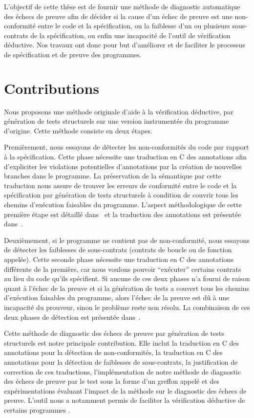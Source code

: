 L'objectif de cette thèse est de fournir une méthode de diagnostic automatique
des échecs de preuve afin de décider si la cause d'un échec de preuve est une
non-conformité entre le code et la spécification, ou la faiblesse d'un ou
plusieurs sous-contrats de la spécification, ou enfin une incapacité de l'outil
de vérification déductive.
Nos travaux ont donc pour but d'améliorer et de faciliter le processus de
spécification et de preuve des programmes.


\section{Contributions}
\label{sec:contrib}


Nous proposons une méthode originale d'aide à la vérification déductive, par
génération de tests structurels sur une version instrumentée du programme
d'origine.
Cette méthode consiste en deux étapes.

Premièrement, nous essayons de détecter les non-conformités du code par
rapport à la spécification.
Cette phase nécessite une traduction en C des annotations \acsl afin
d'expliciter les violations potentielles d'annotations par la création de
nouvelles branches dans le programme.
La préservation de la sémantique par cette traduction nous assure de trouver
les erreurs de conformité entre le code et la spécification par génération de
tests structurels à condition de couvrir tous les chemins d'exécution faisables
du programme.
L'aspect méthodologique de cette première étape est détaillé
dans~\cite{Petiot/TAP14} et la traduction des annotations est présentée
dans~\cite{Petiot/SCAM14}.

Deuxièmement, si le programme ne contient pas de non-conformité, nous essayons
de détecter les faiblesses de sous-contrats (contrats de boucle ou de fonction
appelée).
Cette seconde phase nécessite une traduction en C des annotations \acsl
différente de la première, car nous voulons pouvoir ``exécuter'' certains
contrats au lieu du code qu'ils spécifient.
Si aucune de ces deux phases n'a fourni de raison quant à l'échec de la preuve
et si la génération de tests a couvert tous les chemins d'exécution faisables
du programme, alors l'échec de la preuve est dû à une incapacité du prouveur,
sinon le problème reste non résolu.
La combinaison de ces deux phases de détection est présentée
dans~\cite{Petiot/unpublished15}.

Cette méthode de diagnostic des échecs de preuve par génération de tests
structurels est notre principale contribution.
Elle inclut la traduction en C des annotations \acsl pour la détection de
non-conformités, la traduction en C des annotations \acsl pour la détection de
faiblesses de sous-contrats, la justification de correction de ces traductions,
l'implémentation de notre méthode de diagnostic des échecs de preuve par le test
sous la forme d'un greffon \framac appelé \stady et des expérimentations
évaluant l'impact de la méthode sur le diagnostic des échecs de preuve.
L'outil \stady nous a notamment permis de faciliter la vérification déductive de
certains programmes \cite{Genestier/TAP15}.

